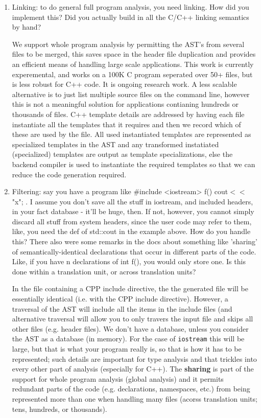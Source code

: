 \begin{enumerate}
\item Linking: to do general full program analysis, you need linking. How did you
    implement this? Did you actually build in all the C/C++ linking semantics by hand?

   We support whole program analysis by permitting the AST's from several files to be
   merged, this saves space in the header file duplication and provides an efficient means
   of handling large scale applications.  This work is currently experemental, and works
   on a 100K C program seperated over 50+ files, but is less robust for C++ code.  It is 
   ongoing research work.  A less scalable alternative is to just list multiple source
   files on the command line, however this is not a meaningful solution for applications
   contianing hundreds or thousands of files.  C++ template details are addressed by
   having each file instantiate all the templates that it requires and then we record
   which of these are used by the file.  All used instantiated templates are represented
   as specialized templates in the AST and any transformed instatiated (specialized)
   templates are output as template specializations, else the backend compiler is used to
   instantiate the required templates so that we can reduce the code generation required.


\item Filtering: say you have a program like \#include <iostream> f() { cout$<<$"x"; }. I
    assume you don't save all the stuff in iostream, and included headers, in your fact
    database - it'll be huge, then. If not, however, you cannot simply discard all stuff
    from system headers, since the user code may refer to them, like, you need the def of
    std::cout in the example above. How do you handle this?
    There also were some remarks in the docs about something like 'sharing' of
    semantically-identical declarations that occur in different parts of the code. Like,
    if you have n declarations of int f(), you would only store one. Is this done within a
    translation unit, or across translation units?

    In the file containing a CPP include directive, the the generated file will be
    essentially identical (i.e. with the CPP include directive).  However, a traversal of the AST
    will include all the items in the include files (and alternative traversal will allow
    you to only travers the input file and skips all other files (e.g. header files).  
    We don't have a database, unless you
    consider the AST as a database (in memory). For the case of {\tt iostream} this will
    be large, but that is what your program really is, so that is how it has to be
    represented; such details are important for type analysis and that trickles into
    every other part of analysis (especially for C++).  The {\bf sharing} is part of
    the support for whole program analysis (global analysis) and it permits redundant 
    parts of the code (e.g. declarations, namespaces, etc.) from being represented
    more than one when handling many files (acorss translation units; tens, hundreds, 
    or thousands).



\end{enumerate}
